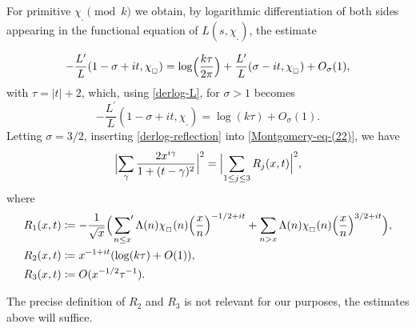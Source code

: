 \documentclass[pdflatex]{sn-jnl}%
\theoremstyle{sltheorems}
\theoremstyle{plainrem}
\theoremstyle{definition}
\begin{document}
For primitive $\chi_{_{\square}} \pmod{k}$
we obtain, by logarithmic differentiation of both sides appearing in the functional equation of 
$L(s,\chi_{_{\square}})$, the estimate

\begin{equation*}
- \frac{L^\prime}{L}(1-\sigma+it, \chi_{_{\square}})
=
\log \Bigl(\frac{k\tau}{2\pi} \Bigr)
+ \frac{L^\prime}{L}(\sigma-it, \chi_{_{\square}})
+O_\sigma (1),
\end{equation*}
%
with \( \tau =  \vert t \vert +2\), 
which,  using \eqref{derlog-L}, for $\sigma>1$ becomes
 \begin{equation}
\label{derlog-reflection}
- \frac{L^\prime}{L}(1-\sigma+it, \chi_{_{\square}})
=
\log (k\tau)
+O_\sigma (1).
\end{equation}
Letting $\sigma=3/2$, inserting \eqref{derlog-reflection} into
\eqref{Montgomery-eq-(22)}, we have
\begin{align}\label{eqn8}
\Bigl \vert 
\sum_{\substack
{\gamma
}} \frac{2x^{i\gamma}}{1+(t-\gamma)^2} \Bigr \vert ^2
= \Bigl \vert \sum_{1\le  j \le  3} R_j(x,t)\Bigr \vert ^2,
\end{align}
where 
\begin{align*}
R_1(x,t) & \coloneq 
- \frac{1}{\sqrt{x}} 
   \Bigl( 
   \sideset{}{'}\sum_{\substack{n \le x }} \Lambda(n) \chi_{_{\square}}(n) \Bigl(\frac{x}{n}\Bigr)^{-1/2+it}
   + 
   \sum_{\substack{n > x }}\Lambda(n) \chi_{_{\square}}(n)
   \Bigl(\frac{x}{n}\Bigr)^{3/2+ it}
   \Bigr),\\ 
 R_2(x,t) &\coloneq x^{-1+it} 
  ( \log (k \tau) +O(1)), 
\\
R_3(x,t) & \coloneq O( x^{-1/2}\tau^{-1}).
\end{align*} 

The precise definition of $R_2$ and $R_3$ is not relevant for our purposes, the estimates above will suffice. 
\end{document}
